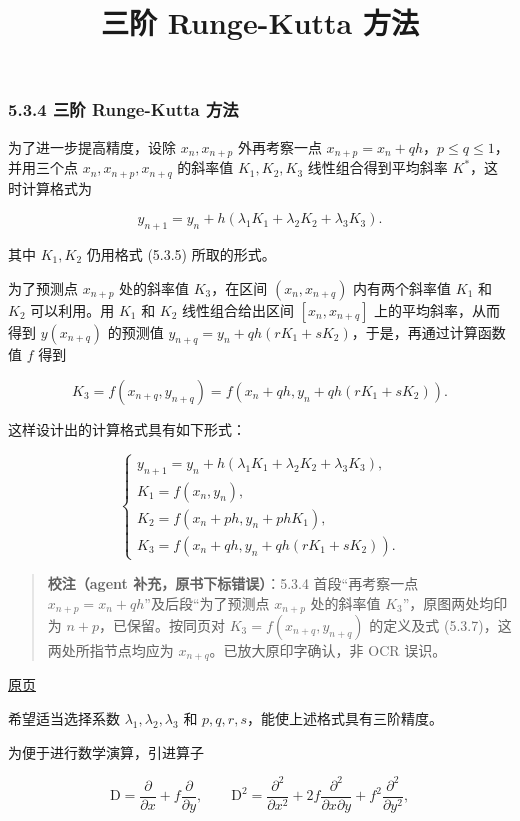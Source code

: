 \documentclass[
  10pt,
  fontset=fandol]{ctexart}
\title{三阶 Runge-Kutta 方法}
\author{}
\date{}
\begin{document}
\maketitle

\subsubsection{5.3.4 三阶 Runge-Kutta 方法}\label{ux4e09ux9636-runge-kutta-ux65b9ux6cd5}

为了进一步提高精度，设除 \(x_n,x_{n+p}\) 外再考察一点 \(x_{n+p}=x_n+qh\)，\(p\leqslant q\leqslant1\)，并用三个点 \(x_n,x_{n+p},x_{n+q}\) 的斜率值 \(K_1,K_2,K_3\) 线性组合得到平均斜率 \(K^*\)，这时计算格式为

\[
y_{n+1}=y_n+h(\lambda_1K_1+\lambda_2K_2+\lambda_3K_3).
\]

其中 \(K_1,K_2\) 仍用格式 (5.3.5) 所取的形式。

为了预测点 \(x_{n+p}\) 处的斜率值 \(K_3\)，在区间 \((x_n,x_{n+q})\) 内有两个斜率值 \(K_1\) 和 \(K_2\) 可以利用。用 \(K_1\) 和 \(K_2\) 线性组合给出区间 \([x_n,x_{n+q}]\) 上的平均斜率，从而得到 \(y(x_{n+q})\) 的预测值 \(y_{n+q}=y_n+qh(rK_1+sK_2)\)，于是，再通过计算函数值 \(f\) 得到

\[
K_3=f(x_{n+q},y_{n+q})=f(x_n+qh,y_n+qh(rK_1+sK_2)).
\]

这样设计出的计算格式具有如下形式：

\[
\begin{cases}
y_{n+1}=y_n+h(\lambda_1K_1+\lambda_2K_2+\lambda_3K_3),\\
K_1=f(x_n,y_n),\\
K_2=f(x_n+ph,y_n+phK_1),\\
K_3=f(x_n+qh,y_n+qh(rK_1+sK_2)).
\end{cases}\tag{5.3.7}
\]

\begin{quote}
\textbf{校注（agent 补充，原书下标错误）}：5.3.4 首段``再考察一点 \(x_{n+p}=x_n+qh\)''及后段``为了预测点 \(x_{n+p}\) 处的斜率值 \(K_3\)''，原图两处均印为 \(n+p\)，已保留。按同页对 \(K_3=f(x_{n+q},y_{n+q})\) 的定义及式 (5.3.7)，这两处所指节点均应为 \(x_{n+q}\)。已放大原印字确认，非 OCR 误识。
\end{quote}

\href{../../source-images/pdf-130.jpeg}{原页}

希望适当选择系数 \(\lambda_1,\lambda_2,\lambda_3\) 和 \(p,q,r,s\)，能使上述格式具有三阶精度。

为便于进行数学演算，引进算子

\[
\mathrm D=\frac{\partial}{\partial x}+f\frac{\partial}{\partial y},\qquad
\mathrm D^2=\frac{\partial^2}{\partial x^2}+2f\frac{\partial^2}{\partial x\partial y}+f^2\frac{\partial^2}{\partial y^2},
\]
\end{document}
